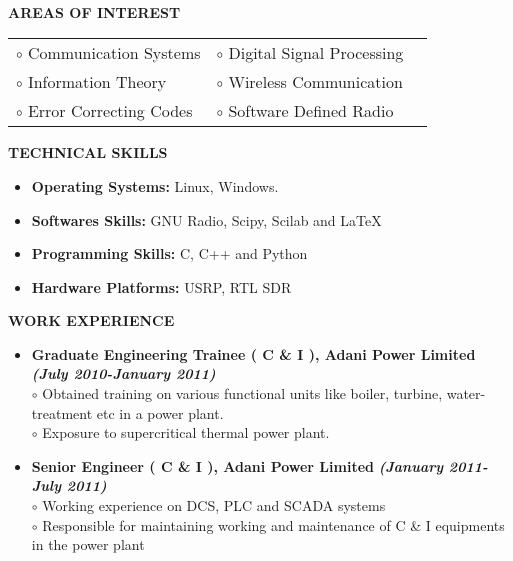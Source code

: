 \documentclass[a4paper,10pt]{article}
\begin{document}
{\qquad \\ \\ \\ \\ \\ \\ \\ \\ \\ \\ \\ \\ \\}

\colorbox{titleColor}{\parbox{6.5in}{\textbf{AREAS OF INTEREST}}}

 \begin{tabular}{p{3.5in}p{5in}p{3.5in}}
    $\circ$ Communication Systems        &$\circ$ Digital Signal Processing \\
    $\circ$ Information Theory       	  &$\circ$ Wireless Communication \\
    $\circ$ Error Correcting Codes	  &$\circ$ Software Defined Radio
  \end{tabular}

 \colorbox{titleColor}{\parbox{6.5in}{\textbf{TECHNICAL SKILLS}}}
 
 \begin{itemize}
 \setlength{\itemsep}{1pt}
 \item \textbf{{Operating Systems:}} Linux, Windows.
 \item \textbf{{Softwares Skills:}} GNU Radio, Scipy, Scilab and \LaTeX
 \item \textbf{{Programming Skills:}} C, C++ and Python
 \item \textbf{{Hardware Platforms:}} USRP, RTL SDR
 \end{itemize}

 \colorbox{titleColor}{\parbox{6.5in}{\textbf{WORK EXPERIENCE}}}

 \begin{itemize}
 \setlength{\itemsep}{1pt}
 \item \textbf{Graduate Engineering Trainee ( C \& I ), Adani Power Limited}  \textbf \emph{(July 2010-January 2011)}\\ 
 $\circ$ Obtained training on various functional units like boiler, turbine, water-treatment etc in a power plant.\\
 $\circ$ Exposure to supercritical thermal power plant.
 \item \textbf{Senior Engineer ( C \& I ), Adani Power Limited}  \textbf \emph{(January 2011-July 2011)}\\
 $\circ$ Working experience on DCS, PLC and SCADA systems \\
 $\circ$ Responsible for maintaining working and maintenance of C \& I equipments in the power plant
\end{itemize}
\end{document}
